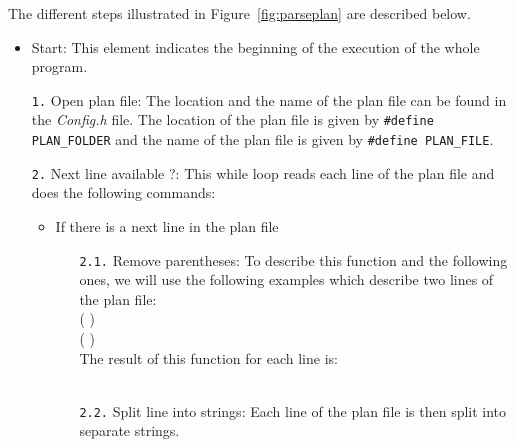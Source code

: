 The different steps illustrated in Figure~\ref{fig:parseplan} are described below.

\begin{itemize}
\item Start: This element indicates the beginning of the execution of the whole program.
\item[\texttt{1.}] Open plan file: The location and the name of the plan file can be found in the \textit{Config.h} file. The location of the plan file is given by \texttt{\footnotesize{\#define PLAN\_FOLDER}} and the name of the plan file is given by \texttt{\footnotesize{\#define PLAN\_FILE}}.
\item[\texttt{2.}] Next line available ?: This while loop reads each line of the plan file and does the following commands:
\begin{itemize}
\item If there is a next line in the plan file
\begin{itemize}
\item[\texttt{2.1.}] Remove parentheses: To describe this function and the following ones, we will use the following examples which describe two lines of the plan file:\\
    \small{(  )} \\
    \small{(   )}\\
    The result of this function for each line is:\\
    \small{  } \\
    \small{   }
\item[\texttt{2.2.}] Split line into strings: Each line of the plan file is then split into separate strings.


\end{itemize}
\end{itemize}
\end{itemize}
